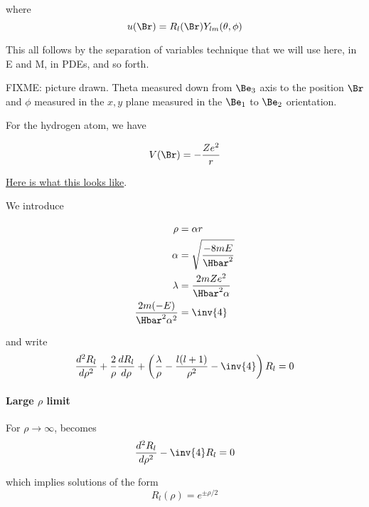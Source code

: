 where
\begin{equation}\label{eqn:PHY356FLecture10:80}
u(\Br) = R_l(\Br) Y_{lm}(\theta, \phi)
\end{equation}

This all follows by the separation of variables technique that we will use here, in E and M, in PDEs, and so forth.

FIXME: picture drawn.  Theta measured down from \(\Be_3\) axis to the position \(\Br\) and \(\phi\) measured in the \(x,y\) plane measured in the \(\Be_1\) to \(\Be_2\) orientation.

For the hydrogen atom, we have

\begin{equation}\label{eqn:PHY356FLecture10:90}
V(\Br) = - \frac{Z e^2}{r}
\end{equation}

\href{http://www.wolframalpha.com/input/?i=graph+-1/r}{Here is what this looks like}.

We introduce

\begin{align}\label{eqn:PHY356FLecture10:100}
\rho &= \alpha r \\
\alpha &= \sqrt{\frac{-8 m E}{\Hbar^2}} \\
\lambda &= \frac{2 m Z e^2}{\Hbar^2 \alpha} \\
\frac{2 m (- E) }{\Hbar^2 \alpha^2 } &= \inv{4}
\end{align}

and write
\begin{equation}\label{eqn:PHY356FLecture10:110}
\frac{d^2 R_l}{d\rho^2} + \frac{2}{\rho} \frac{d R_l}{d\rho} + \left( \frac{\lambda}{\rho} - \frac{l(l+1)}{\rho^2} - \inv{4} \right) R_l = 0
\end{equation}

\paragraph{Large \texorpdfstring{\(\rho\)}{rho} limit}

For \(\rho \rightarrow \infty\),  becomes
\begin{equation}\label{eqn:PHY356FLecture10:120}
\frac{d^2 R_l}{d\rho^2} - \inv{4} R_l = 0
\end{equation}

which implies solutions of the form
\begin{equation}\label{eqn:PHY356FLecture10:130}
R_l(\rho) = e^{\pm \rho/2}
\end{equation}

